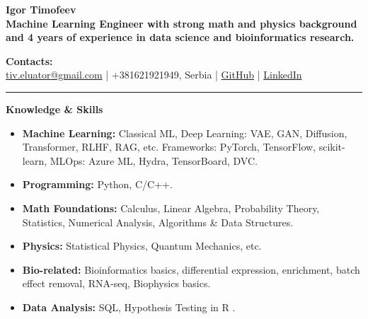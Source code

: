 \documentclass[12pt]{article}
\begin{document}
\begin{center}
    {\Huge \textbf{Igor Timofeev}}\\[6pt]
    \textbf{Machine Learning Engineer with strong math and physics background and 4 years of experience in data science and bioinformatics research.}\\
\end{center}

\vspace{1em}

\noindent\textbf{Contacts:}\\
\href{mailto:tiv.eluator@gmail.com}{tiv.eluator@gmail.com} \quad | \quad
+381621921949, Serbia \quad | \quad
\href{https://github.com/eluator}{GitHub} \quad | \quad
\href{https://www.linkedin.com/in/itimofeev}{LinkedIn}

\vspace{1em}
\hrule
\vspace{1em}

\noindent \textbf{\Large Knowledge \& Skills}
\begin{itemize}
    \item \textbf{Machine Learning:} Classical ML, Deep Learning: VAE, GAN, Diffusion, Transformer, RLHF, RAG, etc. Frameworks: PyTorch, TensorFlow, scikit-learn, MLOps: Azure ML, Hydra, TensorBoard, DVC.
    \item \textbf{Programming:} Python, C/C++.
    \item \textbf{Math Foundations:} Calculus, Linear Algebra, Probability Theory, Statistics, Numerical Analysis, Algorithms \& Data Structures.
    \item \textbf{Physics:} Statistical Physics, Quantum Mechanics, etc.
    \item \textbf{Bio-related:} Bioinformatics basics, differential expression, enrichment, batch effect removal, RNA-seq, Biophysics basics.
    \item \textbf{Data Analysis:} SQL, Hypothesis Testing in R \href{https://github.com/eluator/DataAnalysisInR}{\faGithub}.
\end{itemize}

\vspace{1em}
\end{document}
